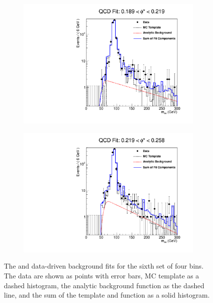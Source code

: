 \begin{figure}[!htbp]
\begin{subfigure}[b]{\SideBySidePlotWidth}
        \includegraphics[width=\linewidth]{figures/qcd_fits/qcd_fit_plot_for_23.pdf}
        \caption{}
        \label{fig:qcd_fit_23}
    \end{subfigure}%
    \begin{subfigure}[b]{\SideBySidePlotWidth}
        \includegraphics[width=\linewidth]{figures/qcd_fits/qcd_fit_plot_for_24.pdf}
        \caption{}
        \label{fig:qcd_fit_24}
    \end{subfigure}
    \caption[
       The \QCDjets and \wjets data-driven background fits for the sixth set of
       four \phistar bins.
    ]{
       The \QCDjets and \wjets data-driven background fits for the sixth set of
       four \phistar bins. The data are shown as points with error bars, MC
       template as a dashed histogram, the analytic background function as the
       dashed line, and the sum of the template and function as a solid
       histogram.
    }
    \label{fig:qcd_many_6}
\end{figure}

